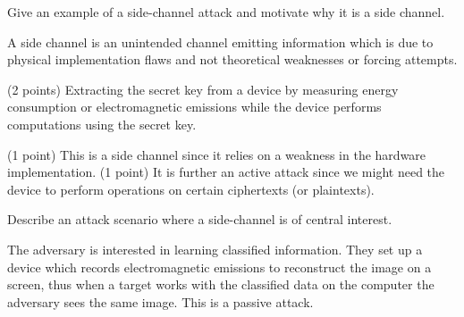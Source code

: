 \question\label{q:sidechannels}


\question[4]\label{q:sidechannels}
Give an example of a side-channel attack and motivate why it is a side channel.

\begin{solution}
  A side channel is an unintended channel emitting information which is due 
  to physical implementation flaws and not theoretical weaknesses or forcing 
  attempts.

  (2 points) Extracting the secret key from a device by measuring energy 
  consumption or electromagnetic emissions while the device performs 
  computations using the secret key.

  (1 point) This is a side channel since it relies on a weakness in the 
  hardware implementation.
  (1 point) It is further an active attack since we might need the device to 
  perform operations on certain ciphertexts (or plaintexts).
\end{solution}




\question[2]\label{q:sidechannels}
Describe an attack scenario where a side-channel is of central interest.

\begin{solution}
  The adversary is interested in learning classified information.
  They set up a device which records electromagnetic emissions to reconstruct 
  the image on a screen, thus when a target works with the classified data on 
  the computer the adversary sees the same image.
  This is a passive attack.
\end{solution}



